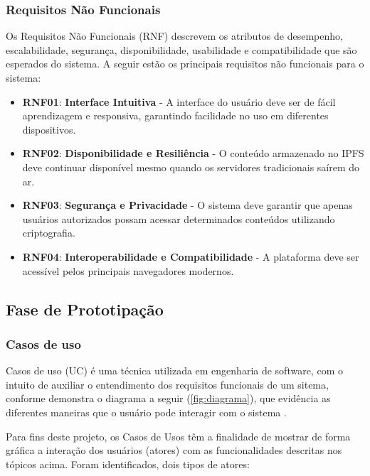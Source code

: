         \subsubsection{Requisitos Não Funcionais}
        Os Requisitos Não Funcionais (RNF) descrevem os atributos de desempenho, escalabilidade, segurança, disponibilidade, usabilidade e compatibilidade que são esperados do sistema. A seguir estão os principais requisitos não funcionais para o sistema:

        \begin{itemize}
            \item \textbf{RNF01}: \textbf{Interface Intuitiva} - A interface do usuário deve ser de fácil aprendizagem e responsiva, garantindo facilidade no uso em diferentes dispositivos.
            \item \textbf{RNF02}: \textbf{Disponibilidade e Resiliência} - O conteúdo armazenado no IPFS deve continuar disponível mesmo quando os servidores tradicionais saírem do ar.
            \item \textbf{RNF03}: \textbf{Segurança e Privacidade} - O sistema deve garantir que apenas usuários autorizados possam acessar determinados conteúdos utilizando criptografia.
            \item \textbf{RNF04}: \textbf{Interoperabilidade e Compatibilidade} - A plataforma deve ser acessível pelos principais navegadores modernos.
        \end{itemize}

    \subsection{Fase de Prototipação}

        \subsubsection{Casos de uso}
        Casos de uso (UC) é uma técnica utilizada em engenharia de software, com o intuito de auxiliar o entendimento dos requisitos funcionais de um sitema, conforme demonstra o diagrama a seguir (\ref{fig:diagrama}), que evidência as diferentes maneiras que o usuário pode interagir com o sistema \cite{lucidchart2025}.

        Para fins deste projeto, os Casos de Usos têm a finalidade de mostrar de forma gráfica a interação dos usuários (atores) com as funcionalidades descritas nos tópicos acima. Foram identificados, dois tipos de atores:
        
